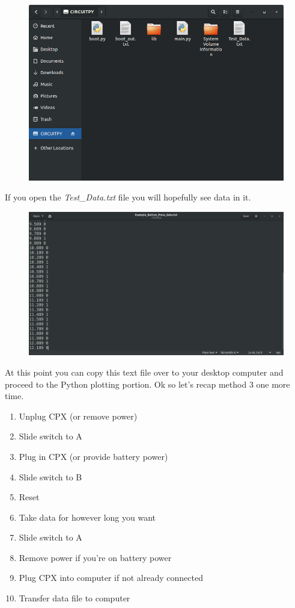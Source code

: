 \begin{figure}[H]
  \begin{center}
    \includegraphics[width=\textwidth]{Figures/method3_3.png}
  \end{center}
\end{figure}
If you open the {\it Test\_Data.txt} file you will hopefully see data in it.
\begin{figure}[H]
  \begin{center}
    \includegraphics[width=\textwidth]{Figures/Gedit_Data.png}
  \end{center}
\end{figure}
At this point you can copy this text file over to your desktop computer and proceed to the Python plotting portion.
Ok so let’s recap method 3 one more time.
\begin{enumerate}[itemsep=-5pt]
\item Unplug CPX (or remove power)
\item Slide switch to A
\item Plug in CPX (or provide battery power)
\item Slide switch to B
\item Reset
\item Take data for however long you want
\item Slide switch to A
\item Remove power if you’re on battery power
\item Plug CPX into computer if not already connected
\item Transfer data file to computer
\end{enumerate}

